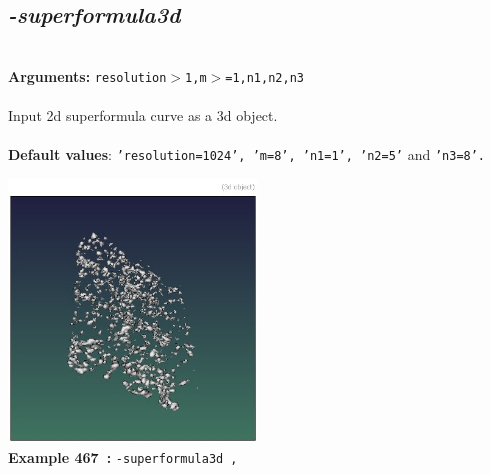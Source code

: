 \documentclass[a4paper,11pt,twoside]{book}
\begin{document}
\subsection{\emph{-superformula3d} }\vspace*{-0.5em}
~\\\textbf{Arguments: } 
{\small \texttt{resolution$>$1,m$>$=1,n1,n2,n3}}\\~\\
Input 2d superformula curve as a 3d object.
~\\~\\\textbf{Default values}: {\small \texttt{'resolution=1024', 'm=8', 'n1=1', 'n2=5'} and \texttt{'n3=8'.}}
\begin{center}\includegraphics[keepaspectratio=true,height=7cm,width=\textwidth]{img/gmic_def467.jpg}\\
{\footnotesize \textbf{Example 467~:} \texttt{-superformula3d ,}}
\end{center}
\end{document}
